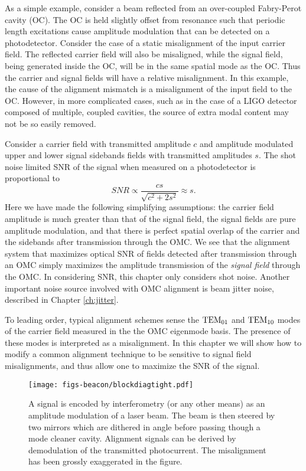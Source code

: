 As a simple example, consider a beam reflected from an over-coupled Fabry-Perot cavity (OC). %
The OC is held slightly offset from resonance such that periodic length excitations cause amplitude modulation that can be detected on a photodetector. %
Consider the case of a static misalignment of the input carrier field. %
The reflected carrier field will also be misaligned, while the signal field, being generated inside the OC, will be in the same spatial mode as the OC. %
Thus the carrier and signal fields will have a relative misalignment. %
In this example, the cause of the alignment mismatch is a misalignment of the input field to the OC. %
However, in more complicated cases, such as in the case of a LIGO detector composed of multiple, coupled cavities, the source of extra modal content may not be so easily removed.

Consider a carrier field with transmitted amplitude $c$ and amplitude modulated upper and lower signal sidebands fields with transmitted amplitudes $s$. %
The shot noise limited SNR of the signal when measured on a photodetector is proportional to
%
\begin{equation}
SNR \propto \frac{cs}{\sqrt{c^2 + 2s^2}} \approx s.
\end{equation}
%
Here we have made the following simplifying assumptions: the carrier field amplitude is much greater than that of the signal field, the signal fields are pure amplitude modulation, and that there is perfect spatial overlap of the carrier and the sidebands after transmission through the OMC. %
We see that the alignment system that maximizes optical SNR of fields detected after transmission through an OMC simply maximizes the amplitude transmission of the {\it signal field} through the OMC. %
In considering SNR, this chapter only considers shot noise. %
Another important noise source involved with OMC alignment is beam jitter noise, described in Chapter \ref{ch:jitter}.

To leading order, typical alignment schemes sense the ${\rm TEM}_{01}$ and ${\rm TEM}_{10}$  modes of the carrier field measured in the the OMC eigenmode basis\cite{Anderson1984}. %
The presence of these modes is interpreted as a misalignment. %
In this chapter we will show how to modify a common alignment technique to be sensitive to signal field misalignments, and thus allow one to maximize the SNR of the signal.

\begin{figure}%
  \begin{center}
  \leavevmode
  \texttt{[image: figs-beacon/blockdiagtight.pdf]}
  \end{center}
  \caption[Block diagram of dither alignment sensing.]{A signal is encoded by interferometry (or any other means) as an amplitude modulation of a laser beam. The beam is then steered by two mirrors which are dithered in angle before passing though a mode cleaner cavity. Alignment signals can be derived by demodulation of the transmitted photocurrent. The misalignment has been grossly exaggerated in the figure.}
  \label{fig:beaconblockdiag}
\end{figure}

